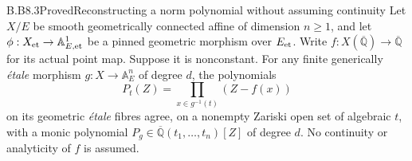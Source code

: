 \begin{claim}{B.B8.3}{Proved}{Reconstructing a norm polynomial without assuming continuity}
Let $X/E$ be smooth geometrically connected affine of dimension
$n\geq1$, and let
$\phi:X_{\rm et}\to\mathbb A^1_{E,\rm et}$ be a pinned geometric
morphism over $E_{\rm et}$.  Write
$f:X(\overline{\mathbb Q})\to\overline{\mathbb Q}$ for its actual
point map.  Suppose it is nonconstant.  For any finite generically
\emph{\'etale} morphism $g:X\to\mathbb A^n_E$ of degree $d$,
the polynomials
\[
 P_t(Z)=\prod_{x\in g^{-1}(t)}(Z-f(x))                    \tag{B.NORM.4}
\]
on its geometric \emph{\'etale} fibres agree, on a nonempty
Zariski open set of algebraic $t$, with a monic polynomial
$P_g\in\overline{\mathbb Q}(t_1,\ldots,t_n)[Z]$ of degree $d$.
No continuity or analyticity of $f$ is assumed.
\end{claim}
